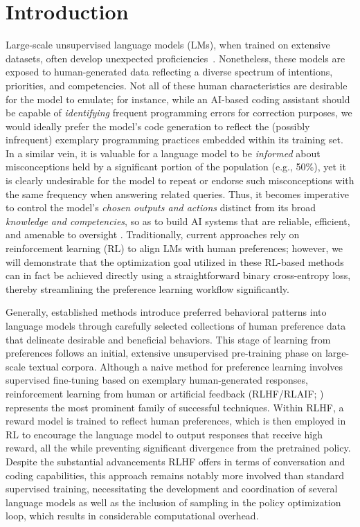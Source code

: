 \section{Introduction}
Large-scale unsupervised language models (LMs), when trained on extensive datasets, often develop unexpected proficiencies~\citep{chowdhery2022palm, brown2020language, touvron2023llama,bubeck2023sparks}. Nonetheless, these models are exposed to human-generated data reflecting a diverse spectrum of intentions, priorities, and competencies. Not all of these human characteristics are desirable for the model to emulate; for instance, while an AI-based coding assistant should be capable of \textit{identifying} frequent programming errors for correction purposes, we would ideally prefer the model's code generation to reflect the (possibly infrequent) exemplary programming practices embedded within its training set. In a similar vein, it is valuable for a language model to be \textit{informed} about misconceptions held by a significant portion of the population (e.g., 50\%), yet it is clearly undesirable for the model to repeat or endorse such misconceptions with the same frequency when answering related queries. Thus, it becomes imperative to control the model's \emph{chosen outputs and actions} distinct from its broad \textit{knowledge and competencies}, so as to build AI systems that are reliable, efficient, and amenable to oversight \citep{ouyang2022training}. Traditionally, current approaches rely on reinforcement learning (RL) to align LMs with human preferences; however, we will demonstrate that the optimization goal utilized in these RL-based methods can in fact be achieved directly using a straightforward binary cross-entropy loss, thereby streamlining the preference learning workflow significantly.

Generally, established methods introduce preferred behavioral patterns into language models through carefully selected collections of human preference data that delineate desirable and beneficial behaviors. This stage of learning from preferences follows an initial, extensive unsupervised pre-training phase on large-scale textual corpora. Although a naive method for preference learning involves supervised fine-tuning based on exemplary human-generated responses, reinforcement learning from human or artificial feedback (RLHF/RLAIF; \citep{christiano2017deep,bai2022constitutional}) represents the most prominent family of successful techniques. Within RLHF, a reward model is trained to reflect human preferences, which is then employed in RL to encourage the language model to output responses that receive high reward, all the while preventing significant divergence from the pretrained policy. Despite the substantial advancements RLHF offers in terms of conversation and coding capabilities, this approach remains notably more involved than standard supervised training, necessitating the development and coordination of several language models as well as the inclusion of sampling in the policy optimization loop, which results in considerable computational overhead.

